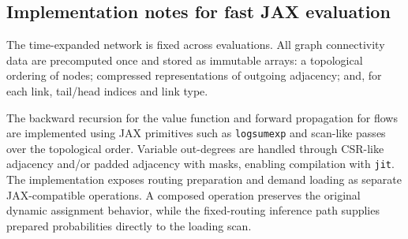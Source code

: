 \subsection{Implementation notes for fast JAX evaluation}

The time-expanded network is fixed across evaluations. All graph connectivity data are precomputed once and stored as immutable arrays:
a topological ordering of nodes; compressed representations of outgoing adjacency; and, for each link, tail/head indices and link type.

The backward recursion for the value function and forward propagation for flows are implemented using JAX primitives such as
\texttt{logsumexp} and scan-like passes over the topological order. Variable out-degrees are handled through CSR-like adjacency
and/or padded adjacency with masks, enabling compilation with \texttt{jit}.
The implementation exposes routing preparation and demand loading as separate
JAX-compatible operations. A composed operation preserves the original dynamic
assignment behavior, while the fixed-routing inference path supplies prepared
probabilities directly to the loading scan.

